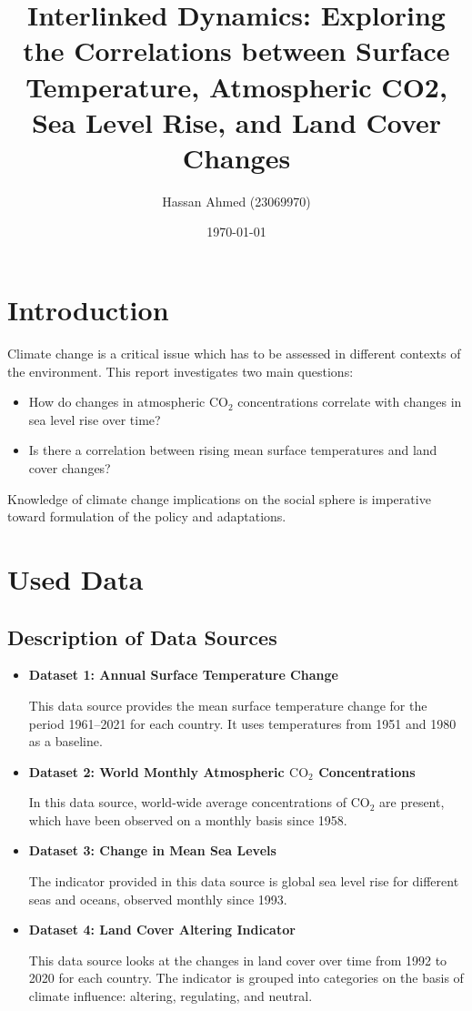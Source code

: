 \documentclass[a4paper,11pt]{article}
\title{Interlinked Dynamics: Exploring the Correlations between Surface Temperature, Atmospheric CO2, Sea Level Rise, and Land Cover Changes}
\author{Hassan Ahmed (23069970)}
\date{\today}
\begin{document}
\maketitle

\section{Introduction}
Climate change is a critical issue which has to be assessed in different contexts of the environment. 
This report investigates two main questions:
\begin{itemize}
    \item How do changes in atmospheric \(\text{CO}_2\) concentrations correlate with changes in sea level rise over time?
    \item Is there a correlation between rising mean surface temperatures and land cover changes?
\end{itemize}
Knowledge of climate change implications on the social sphere is imperative toward formulation of the policy and adaptations.

\section{Used Data}
\subsection{Description of Data Sources}
\begin{itemize}

\item \textbf{Dataset 1: Annual Surface Temperature Change}
    
This data source provides the mean surface temperature change for the period 1961–2021 for each country. It uses temperatures from 1951 and 1980 as a baseline. \cite{dataset1} 
    
\item \textbf{Dataset 2: World Monthly Atmospheric \(\text{CO}_2\) Concentrations}

In this data source, world-wide average concentrations of \(\text{CO}_2\) are present, which have been observed on a monthly basis since 1958. \cite{dataset2}
    
\item \textbf{Dataset 3: Change in Mean Sea Levels}

The indicator provided in this data source is global sea level rise for different seas and oceans, observed monthly since 1993. \cite{dataset3}

\item \textbf{Dataset 4: Land Cover Altering Indicator}

This data source looks at the changes in land cover over time from 1992 to 2020 for each country. The indicator is grouped into categories on the basis of climate influence: altering, regulating, and neutral. \cite{dataset4}

\end{itemize}
\end{document}
